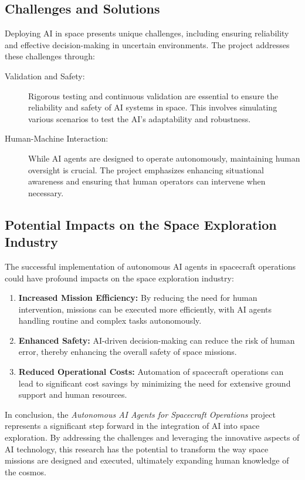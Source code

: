 \documentclass[a4paper,12pt]{article}
\begin{document}
\subsection{Challenges and Solutions}

Deploying AI in space presents unique challenges, including ensuring reliability and effective decision-making in uncertain environments. The project addresses these challenges through:

\begin{description}
    \item[Validation and Safety:] Rigorous testing and continuous validation are essential to ensure the reliability and safety of AI systems in space. This involves simulating various scenarios to test the AI's adaptability and robustness.
    \item[Human-Machine Interaction:] While AI agents are designed to operate autonomously, maintaining human oversight is crucial. The project emphasizes enhancing situational awareness and ensuring that human operators can intervene when necessary.
\end{description}

\subsection{Potential Impacts on the Space Exploration Industry}

The successful implementation of autonomous AI agents in spacecraft operations could have profound impacts on the space exploration industry:

\begin{enumerate}
    \item \textbf{Increased Mission Efficiency:} By reducing the need for human intervention, missions can be executed more efficiently, with AI agents handling routine and complex tasks autonomously.
    \item \textbf{Enhanced Safety:} AI-driven decision-making can reduce the risk of human error, thereby enhancing the overall safety of space missions.
    \item \textbf{Reduced Operational Costs:} Automation of spacecraft operations can lead to significant cost savings by minimizing the need for extensive ground support and human resources.
\end{enumerate}

In conclusion, the \textit{Autonomous AI Agents for Spacecraft Operations} project represents a significant step forward in the integration of AI into space exploration. By addressing the challenges and leveraging the innovative aspects of AI technology, this research has the potential to transform the way space missions are designed and executed, ultimately expanding human knowledge of the cosmos.
\end{document}
